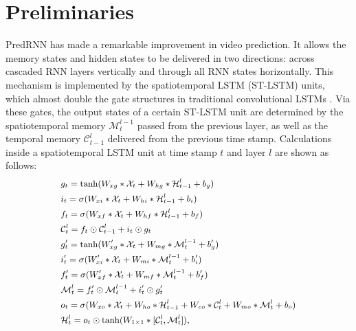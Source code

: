 \documentclass[10pt,twocolumn,letterpaper]{article}
\begin{document}
\section{Preliminaries}
\label{sec:Preliminaries}
PredRNN \citep{wang2017predrnn} has made a remarkable improvement in video prediction. It allows the memory states and hidden states to be delivered in two directions: across cascaded RNN layers vertically and through all RNN states horizontally. This mechanism is implemented by the spatiotemporal LSTM (ST-LSTM) units, which almost double the gate structures in traditional convolutional LSTMs \citep{shi2015convolutional}. Via these gates, the output states of a certain ST-LSTM unit are determined by the spatiotemporal memory $\mathcal{M}_t^{l-1}$ passed from the previous layer, as well as the temporal memory $\mathcal{C}_{t-1}^l$ delivered from the previous time stamp. Calculations inside a spatiotemporal LSTM unit at time stamp $t$ and layer $l$ are shown as follows:
\begin{equation}\label{equ:stlstm}
  \small
  \begin{split}
  & g_t = \tanh(W_{xg} \ast \mathcal{X}_t + W_{hg} \ast \mathcal{H}_{t-1}^l + b_g) \\
  & i_t = \sigma(W_{xi} \ast \mathcal{X}_t + W_{hi} \ast \mathcal{H}_{t-1}^l + b_i) \\
  & f_t = \sigma(W_{xf} \ast \mathcal{X}_t + W_{hf} \ast \mathcal{H}_{t-1}^l + b_f) \\
  & \mathcal{C}_t^l = f_t \odot \mathcal{C}_{t-1}^l + i_t \odot g_t \\
  & g_t^\prime = \tanh(W_{xg}^\prime \ast \mathcal{X}_t + W_{mg} \ast \mathcal{M}_t^{l-1} + b_g^\prime) \\
  & i_t^\prime = \sigma(W_{xi}^\prime \ast \mathcal{X}_t + W_{mi} \ast \mathcal{M}_t^{l-1} + b_i^\prime) \\
  & f_t^\prime = \sigma(W_{xf}^\prime \ast \mathcal{X}_t + W_{mf} \ast \mathcal{M}_t^{l-1} + b_f^\prime) \\
  & \mathcal{M}_t^l = f_t^\prime \odot \mathcal{M}_t^{l-1} + i_t^\prime \odot g_t^\prime \\
  & o_t = \sigma(W_{xo} \ast \mathcal{X}_t + W_{ho} \ast \mathcal{H}_{t-1}^l + W_{co} \ast \mathcal{C}_t^l + W_{mo} \ast \mathcal{M}_t^l + b_o) \\ 
  & \mathcal{H}_t^l = o_t \odot \tanh(W_{1\times1} \ast [\mathcal{C}_t^l, \mathcal{M}_t^l]),\\
  \end{split}
\end{equation}
\end{document}
